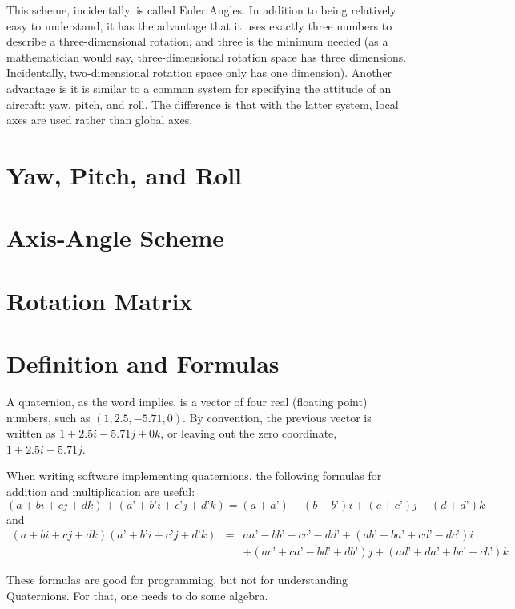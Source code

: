 \documentclass[letter,12pt]{article}
\begin{document}
This scheme, incidentally, is called Euler Angles.   In addition to being relatively easy to understand, it has the advantage that it uses exactly three numbers to describe a three-dimensional rotation, and three is the minimum needed (as a mathematician would say, three-dimensional rotation space has three dimensions.  Incidentally, two-dimensional rotation space only has one dimension).  Another advantage is it is similar to a common system for specifying the attitude of an aircraft: yaw, pitch, and roll.  The difference is that with the latter system, local axes are used rather than global axes.

\section{Yaw, Pitch, and Roll}

\section{Axis-Angle Scheme}

\section{Rotation Matrix}








\section{Definition and Formulas}

A quaternion, as the word implies, is a vector of four real (floating point) numbers, such as $(1, 2.5, -5.71, 0)$.  By convention, the previous vector is written as $1 + 2.5i - 5.71j + 0k$, or leaving out the zero coordinate, $1 + 2.5i - 5.71j$.  

When writing software implementing quaternions, the following formulas for addition and multiplication are useful:
\[
(a + bi + cj + dk) + (a’ + b’i + c’j + d’k) = (a+a’) + (b+b’)i + (c+c’)j + (d+d’)k
\]
and
\begin{eqnarray*}
(a + bi + cj + dk)(a’ + b’i + c’j + d’k) &=& aa’ - bb’ - cc’ - dd’  + (ab’ + ba’ + cd’ - dc’)i\\ 
&&+ (ac’ + ca’ - bd’ + db’)j + (ad’ + da’ + bc’ - cb’)k
\end{eqnarray*}

These formulas are good for programming, but not for understanding Quaternions.  For that, one needs to do some algebra.
\end{document}
